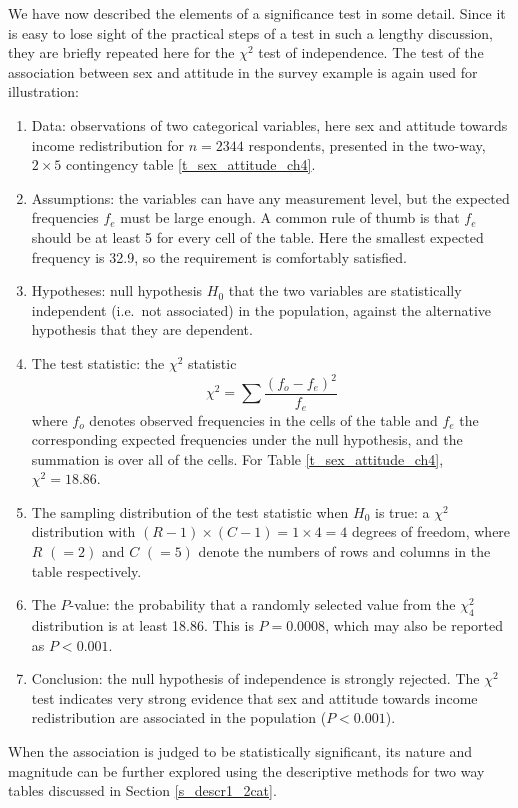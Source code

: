 We have now described the elements of a significance test in some
detail. Since it is easy to lose sight of the practical steps of a test
in such a lengthy discussion, they are briefly repeated here for the
$\chi^{2}$ test of independence.
The test of
the association between sex and attitude in the survey example is again used for illustration:
\begin{enumerate}
\item
Data: observations of two categorical variables, here sex and
attitude towards income redistribution for $n=2344$ respondents, presented in
the two-way, $2\times 5$ contingency table \ref{t_sex_attitude_ch4}.
\item
Assumptions: the variables can have any measurement level, but the expected
frequencies $f_{e}$ must be large enough. A common rule of thumb is that
$f_{e}$ should be at least 5 for every cell of the table. Here the
smallest expected frequency is 32.9, so the requirement is comfortably
satisfied.
\item
Hypotheses: null hypothesis $H_{0}$ that the two
variables are statistically independent (i.e.\ not associated) in the
population, against the alternative hypothesis that they are dependent.
\item
The test statistic: the $\chi^{2}$ statistic
\[
\chi^{2} = \sum
\frac{(f_{o}-f_{e})^{2}}{f_{e}}
\]
where $f_{o}$ denotes observed
frequencies in the cells of the table and $f_{e}$ the corresponding
expected frequencies under the null hypothesis,
and the summation is over all of the cells. For Table
\ref{t_sex_attitude_ch4}, $\chi^{2}=18.86$.
\item
The sampling distribution of
the test statistic when $H_{0}$ is true: a $\chi^{2}$ distribution with
$(R-1)\times(C-1)=1\times 4=4$ degrees of freedom, where $R$ $(=2)$ and
$C$ $(=5)$ denote the numbers of rows and columns in the table
respectively.
\item
The $P$-value: the probability that a randomly
selected value from the $\chi^{2}_{4}$ distribution is at least 18.86.
This is $P=0.0008$, which may also be reported as $P<0.001$.
\item
Conclusion: the null hypothesis of independence is strongly rejected.
The $\chi^{2}$ test indicates very strong evidence that sex and
attitude towards income redistribution are associated in the population
($P<0.001$).
\end{enumerate}
When the association is judged to be
statistically significant, its nature and magnitude can be further
explored using the descriptive methods for two way tables discussed in Section
\ref{s_descr1_2cat}.


